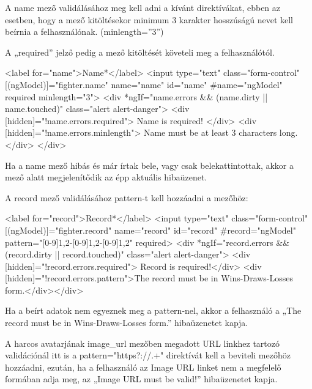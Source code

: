 A name mező validálásához meg kell adni a kívánt direktívákat, ebben az esetben, hogy a mező kitöltésekor minimum 3 karakter hosszúságú nevet kell beírnia a felhasználónak. (minlength=”3”)

A „required” jelző pedig a mező kitöltését követeli meg a felhasználótól.

\begin{cpp}
<label for="name">Name*</label>
<input type="text" class="form-control" [(ngModel)]="fighter.name" 
name="name" id="name" #name="ngModel" required minlength="3">
<div *ngIf="name.errors && (name.dirty || name.touched)" 
	class="alert alert-danger">
	<div [hidden]="!name.errors.required">
    	Name is required!
    </div>
    <div [hidden]="!name.errors.minlength">
    	Name must be at least 3 characters long.
    </div>
</div>
\end{cpp}

Ha a name mező hibás és már írtak bele, vagy csak belekattintottak, akkor a mező alatt megjelenítődik az épp aktuális hibaüzenet.

A record mező validálásához pattern-t kell hozzáadni a mezőhöz:

\begin{cpp}
<label for="record">Record*</label>
<input type="text" class="form-control" [(ngModel)]="fighter.record" 
name="record" id="record" #record="ngModel" 
pattern="[0-9]{1,2}-[0-9]{1,2}-[0-9]{1,2}" required>
<div *ngIf="record.errors && (record.dirty || record.touched)" 
class="alert alert-danger">
<div [hidden]="!record.errors.required">
	Record is required!</div>
<div [hidden]="!record.errors.pattern">The record must be in 
Wins-Draws-Losses form.</div></div>
\end{cpp}

Ha a beírt adatok nem egyeznek meg a pattern-nel, akkor a felhasználó a „The record must be in Wins-Draws-Losses form.” hibaüzenetet kapja.

A harcos avatarjának image\_url mezőben megadott URL linkhez tartozó validációnál itt is a pattern="https?://.+" direktívát kell a beviteli mezőhöz hozzáadni, ezután, ha a felhasználó az Image URL linket nem a megfelelő formában adja meg, az „Image URL must be valid!” hibaüzenetet kapja.
\newpage


